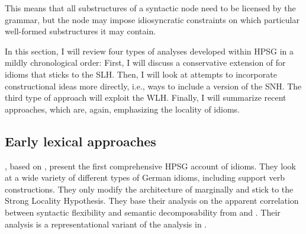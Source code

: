 \documentclass[output=paper
                ,modfonts
                ,nonflat
	        ,collection
	        ,collectionchapter
	        ,collectiontoclongg
 	        ,biblatex
                ,babelshorthands
                ,newtxmath
                ,draftmode
                ,colorlinks, citecolor=brown
]{./langsci/langscibook}
\begin{document}
This means that all substructures of a syntactic node need to be licensed by the grammar, but the node may impose idiosyncratic constraints on which particular well-formed substructures it may contain.




\bigskip%
In this section, I will review four types of analyses developed within HPSG in a mildly chronological order:
First, I will discuss a conservative extension of \citet{ps2} for idioms \citep{KE94a} that sticks to the SLH. 
Then, I will look at attempts to incorporate constructional ideas more directly, i.e., ways to include a version of the SNH. 
The third type of approach will exploit the WLH. Finally, I will summarize recent approaches, which are, again, emphasizing the locality of idioms.




\subsection{Early lexical approaches}
\label{Sec-EarlyLexical}



\citet{KE94a}, based on \citet{Erbach92a}, present the first comprehensive HPSG account of idioms. 
They look at a wide variety of different types of German idioms, including support verb constructions. 
They only modify the architecture of \citet{ps2} marginally and stick to the Strong Locality Hypothesis. 
They base their analysis on the apparent correlation between syntactic flexibility and semantic decomposability from \citet{WSN84a-u} and \citet{NSW94a}. 
Their analysis is a representational variant of the analysis in \citet{GKPS85a}.
\end{document}
